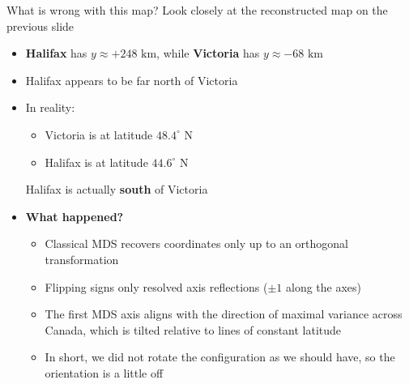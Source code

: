 \documentclass[aspectratio=169]{beamer}\usepackage[]{graphicx}\usepackage[]{xcolor}
\begin{document}
\begin{frame}{What is wrong with this map?}
Look closely at the reconstructed map on the previous slide
\vfill
\begin{itemize}
\item \textbf{Halifax} has $y \approx +248\text{ km}$, while \textbf{Victoria} has $y \approx -68\text{ km}$
\vfill
\item Halifax appears to be far north of Victoria
\vfill
\item In reality:
\begin{itemize}
\item Victoria is at latitude $48.4^\circ\text{ N}$
\item Halifax is at latitude $44.6^\circ\text{ N}$
\end{itemize}
Halifax is actually \textbf{south} of Victoria
\vfill
\item \textbf{What happened?}
\begin{itemize}
\item Classical MDS recovers coordinates only up to an orthogonal transformation
\item Flipping signs only resolved axis reflections ($\pm 1$ along the axes)
\item The first MDS axis aligns with the direction of maximal variance across Canada, which is tilted relative to lines of constant latitude
\item In short, we did not rotate the configuration as we should have, so the orientation is a little off
\end{itemize}
\end{itemize}
\end{frame}
\end{document}
